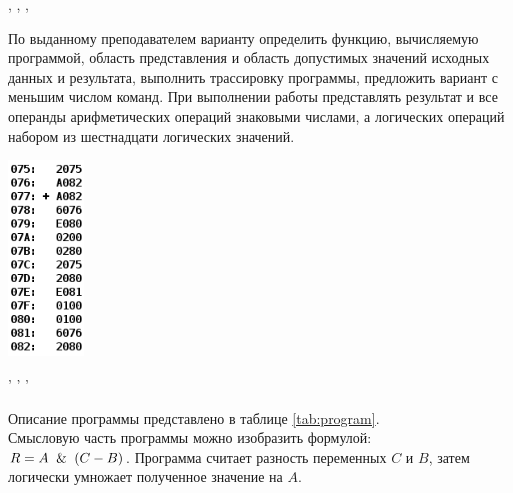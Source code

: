 


\tableofcontents


\newpage
\Chapter{\lab\ \labnumber}{\labtheme}{}
\begin{center}
    , , ,
\end{center}

\indent
По выданному преподавателем варианту определить функцию, вычисляемую программой, область представления и область допустимых значений исходных данных и результата, выполнить трассировку программы, предложить вариант с меньшим числом команд. При выполнении работы представлять результат и все операнды арифметических операций знаковыми числами, а логических операций набором из шестнадцати логических значений.\\

\begin{center}
    \includegraphics[width=0.15\textwidth]{task}
\end{center}

\begin{center}
    ' ' ' 
\end{center}



Описание программы представлено в таблице \ref{tab:program}.\\
Смысловую часть программы можно изобразить формулой:\\ $R=A\And(C-B)$. Программа считает разность переменных $C$ и $B$, затем логически умножает полученное значение на $A$.

